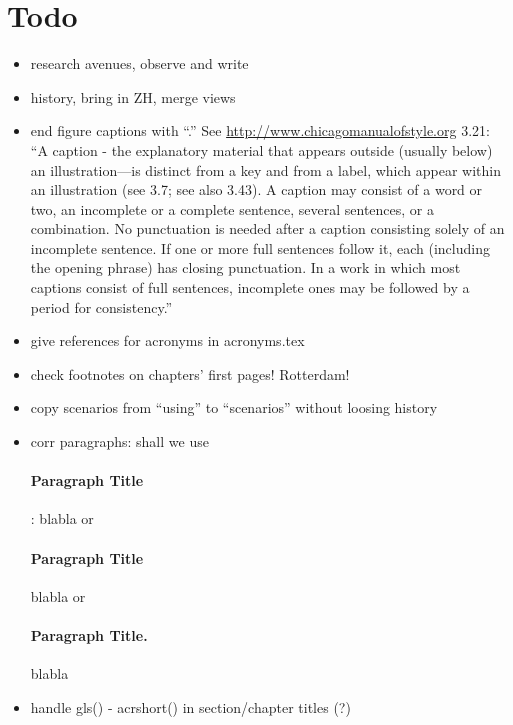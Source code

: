 \section*{Todo}

\begin{itemize}\styleItemize

\item research avenues, observe and write

\item history, bring in ZH, merge views

\item end figure captions with ``.'' See \url{http://www.chicagomanualofstyle.org} 3.21: ``A caption - the explanatory material that appears outside (usually below) an illustration—is distinct from a key and from a label, which appear within an illustration (see 3.7; see also 3.43). A caption may consist of a word or two, an incomplete or a complete sentence, several sentences, or a combination. No punctuation is needed after a caption consisting solely of an incomplete sentence. If one or more full sentences follow it, each (including the opening phrase) has closing punctuation. In a work in which most captions consist of full sentences, incomplete ones may be followed by a period for consistency.''

\item give references for acronyms in acronyms.tex

\item check footnotes on chapters' first pages! Rotterdam!

\item copy scenarios from ``using'' to ``scenarios'' without loosing history

\item corr paragraphs: shall we use \paragraph{Paragraph Title}: blabla or \paragraph{Paragraph Title} blabla or \paragraph{Paragraph Title.} blabla

\item handle gls() - acrshort() in section/chapter titles (?)


\end{itemize}
